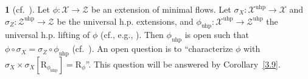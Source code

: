 \documentclass[12pt,final,3p,times]{elsarticle}
\theoremstyle{definition}
\newtheorem{se}[thm]{}
\numberwithin{equation}{section}
\begin{document}
\begin{se}[{cf.~\cite[Q.~IV.6.4b]{Wo}}]\label{3.7}
Let $\phi\colon\mathscr{X}\rightarrow\mathscr{Z}$ be an extension of minimal flows. Let $\sigma_X\colon\mathscr{X}^\textrm{uhp}\rightarrow\mathscr{X}$ and 
$\sigma_Z\colon\mathscr{Z}^\textrm{uhp}\rightarrow\mathscr{Z}$ be the universal h.p. extensions, and $\phi_\textrm{uhp}\colon \mathscr{X}^\textrm{uhp}\rightarrow \mathscr{Z}^\textrm{uhp}$ 
the universal h.p. lifting of $\phi$ (cf., e.g., \cite[IV.3.10]{Wo}). Then $\phi_\textrm{uhp}$ is open such that $\phi\circ\sigma_X=\sigma_Z\circ\phi_\textrm{uhp}$ (cf.~\cite[IV]{Wo}). An open question is to ``characterize $\phi$ with $\sigma_X\times\sigma_X[\mathrm{R}_{\phi_\textrm{uhp}}]=\mathrm{R}_\phi$''. This question will be answered by Corollary~\ref{3.9}.
\end{se}
\end{document}
